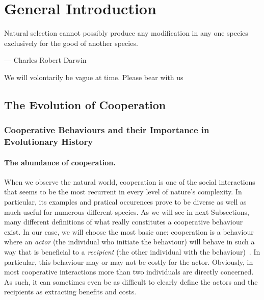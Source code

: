 \chapter{General Introduction}

\epigraph{Natural selection cannot possibly produce any modification in any one species exclusively for the good of another species.}{--- \textup{Charles Robert Darwin}}

\minitoc[n] %

We will volontarily be vague at time. Please bear with us

\section{The Evolution of Cooperation}

  \subsection{Cooperative Behaviours and their Importance in Evolutionary History}


    \subsubsection{The abundance of cooperation.} When we observe the natural world, cooperation is one of the social interactions that seems to be the most recurrent in every level of nature's complexity. In particular, its examples and pratical occurences prove to be diverse as well as much useful for numerous different species. As we will see in next Subsections, many different definitions of what really constitutes a cooperative behaviour exist. In our case, we will choose the most basic one: cooperation is a behaviour where an \emph{actor} (the individual who initiate the behaviour) will behave in such a way that is beneficial to a \emph{recipient} (the other individual with the behaviour)~\parencite{West2007a}. In particular, this behaviour may or may not be costly for the actor. Obviously, in most cooperative interactions more than two individuals are directly concerned. As such, it can sometimes even be as difficult to clearly define the actors and the recipients as extracting benefits and costs.


